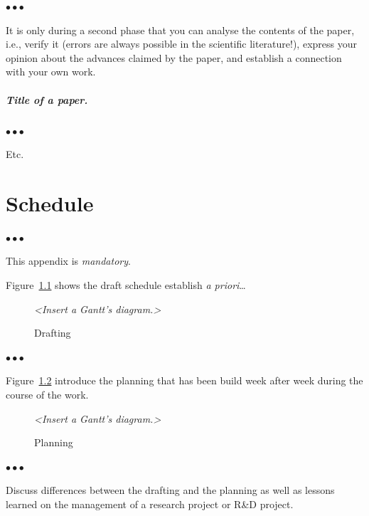 \documentclass[11pt, english, screen, research-development]{report-rd-info}
\newenvironment{explanation}
{\color{blue}
 \begin{list}{}{\hspace{0.2\textwidth}\color{blue}}\item $\bullet\bullet\bullet$
}
{\end{list}}
\begin{document}
\begin{explanation}
   It is only during a second phase that you can analyse the contents of the paper, i.e., verify it (errors are always possible in the scientific literature!), express your opinion about the advances claimed by the paper, and establish a connection with your own work.
\end{explanation}

\paragraph{\emph{Title of a paper}.}

\begin{explanation}
   Etc.
\end{explanation}

\chapter{Schedule}

\begin{explanation}
   This appendix is \emph{mandatory}.

   Figure~\ref{fig:Drafting} shows the draft schedule establish \emph{a priori}\ldots
\end{explanation}

\begin{figure}
   \centering
      \emph{<Insert a Gantt's diagram.>}
   \caption{Drafting}
   \label{fig:Drafting}
\end{figure}

\begin{explanation}
   Figure~\ref{fig:Planning} introduce the planning that has been build week after week during the course of the work.
\end{explanation}

\begin{figure}
   \centering
      \emph{<Insert a Gantt's diagram.>}
   \caption{Planning}
   \label{fig:Planning}
\end{figure}

\begin{explanation}
   Discuss differences between the drafting and the planning as well as lessons learned on the management of a research project or R\&D project.
\end{explanation}
\end{document}
